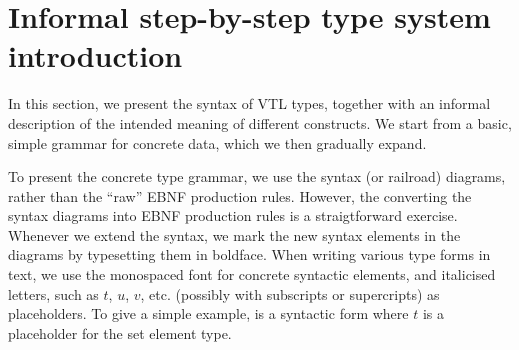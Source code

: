 \documentclass[droidmono,libertine,twoside,user,unofficial]{ecarticle}
\begin{document}

\section{Informal step-by-step type system introduction}
\label{sec:type-system-syntax}

In this section, we present the syntax of VTL types, together with an
informal description of the intended meaning of different constructs.
We start from a basic, simple grammar for concrete data, which we then
gradually expand.

To present the concrete type grammar, we use the syntax (or railroad)
diagrams, rather than the ``raw'' EBNF production rules. However, the
converting the syntax diagrams into EBNF production rules is a
straigtforward exercise.  Whenever we extend the syntax, we mark the
new syntax elements in the diagrams by typesetting them in boldface.
When writing various type forms in text, we use the monospaced font
for concrete syntactic elements, and italicised letters, such as $t$,
$u$, $v$, etc. (possibly with subscripts or supercripts) as
placeholders.  To give a simple example,  is a syntactic
form where $t$ is a placeholder for the set element type.
\end{document}
